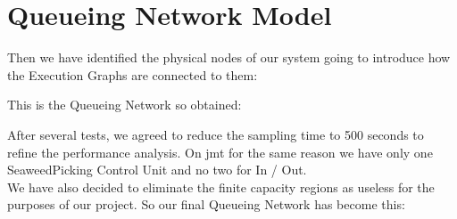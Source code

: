 \newpage \chapter{\textbf{Queueing Network Model}}

Then we have identified the physical nodes of our system going to introduce how the Execution Graphs are connected to them:
\bigskip
\bigskip
\bigskip
\bigskip
\begin{center}
\end{center}
\bigskip
{}

\newpage
This is the Queueing Network so obtained:
\bigskip
\begin{center}
\end{center}
\bigskip
{}

\bigskip
After several tests, we agreed to reduce the sampling time to 500 seconds to refine the performance analysis. On jmt for the same reason we have only one SeaweedPicking Control Unit and no two for In / Out.\\
We have also decided to eliminate the finite capacity regions as useless for the purposes of our project. So our final Queueing Network has become this:
 
\bigskip
\bigskip
\bigskip
\begin{center}
\end{center}
\bigskip
{}